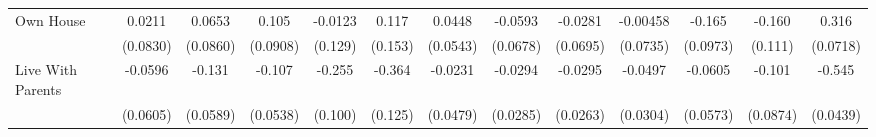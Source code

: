 {\begin{tabular}{l*{12}{c}}
\addlinespace
Own House   &      0.0211         &      0.0653         &       0.105         &     -0.0123         &       0.117         &      0.0448         &     -0.0593         &     -0.0281         &    -0.00458         &      -0.165         &      -0.160         &       0.316\sym{***}\\
            &    (0.0830)         &    (0.0860)         &    (0.0908)         &     (0.129)         &     (0.153)         &    (0.0543)         &    (0.0678)         &    (0.0695)         &    (0.0735)         &    (0.0973)         &     (0.111)         &    (0.0718)         \\
\addlinespace
Live With Parents&     -0.0596         &      -0.131\sym{*}  &      -0.107\sym{*}  &      -0.255\sym{*}  &      -0.364\sym{**} &     -0.0231         &     -0.0294         &     -0.0295         &     -0.0497         &     -0.0605         &      -0.101         &      -0.545\sym{***}\\
            &    (0.0605)         &    (0.0589)         &    (0.0538)         &     (0.100)         &     (0.125)         &    (0.0479)         &    (0.0285)         &    (0.0263)         &    (0.0304)         &    (0.0573)         &    (0.0874)         &    (0.0439)         \\
\bottomrule
\end{tabular}
}
